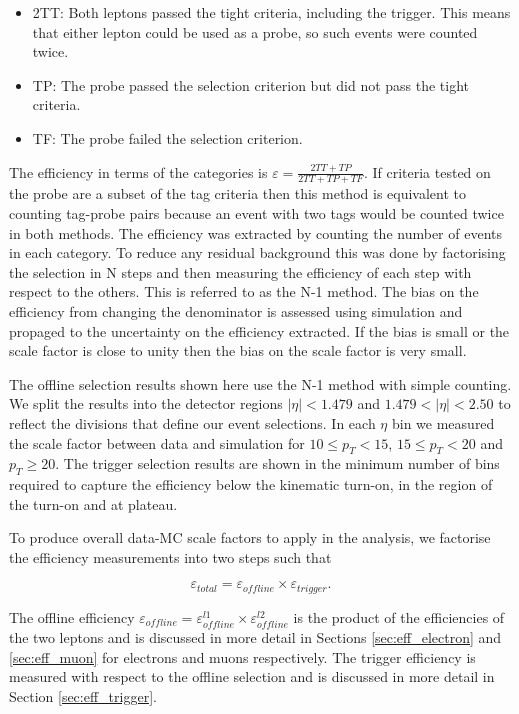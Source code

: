 \begin{itemize}
    \item 2TT: Both leptons passed the tight criteria, including the trigger. This means that either lepton could be used as a probe, 
    so such events were counted twice.
    \item TP: The probe passed the selection criterion but did not pass the tight criteria.
    \item TF: The probe failed the selection criterion.
\end{itemize}

The efficiency in terms of the categories is $\varepsilon = \frac{2TT + TP}{2TT + TP + TF}$.
If criteria tested on the probe are a subset of the tag criteria then
this method is equivalent to counting tag-probe pairs because an event with two tags
would be counted twice in both methods.
The efficiency was extracted by counting the number of events in each category.
To reduce any residual background this was done by factorising the selection in
N steps and then measuring the efficiency of each step with respect to 
the others.  This is referred to as the N-1 method.
The bias on the efficiency from changing the denominator is assessed using
simulation and propaged to the uncertainty on the efficiency extracted.
If the bias is small or the scale factor is close to unity then the bias on
the scale factor is very small.

The offline selection results shown here use the N-1 method with simple counting.
We split the results into the detector regions $|\eta|<1.479$ and $1.479<|\eta|<2.50$
to reflect the divisions that define our event selections.
In each $\eta$ bin we measured the scale factor between data and simulation
for $10\leq p_T<15$, $15\leq p_T<20$ and $p_T\geq 20$.
The trigger selection results are shown in the minimum number of bins required
to capture the efficiency below the kinematic turn-on, in the region of the turn-on
and at plateau.

To produce overall data-MC scale factors to apply in the analysis, we factorise the efficiency measurements
into two steps such that

\begin{equation}
\varepsilon_{total} = \varepsilon_{offline} \times \varepsilon_{trigger}.
\end{equation}

The offline efficiency $\varepsilon_{offline} = \varepsilon_{offline}^{l1} \times \varepsilon_{offline}^{l2}$
is the product of the efficiencies of the two leptons and is discussed in more detail in Sections \ref{sec:eff_electron}
and \ref{sec:eff_muon} for electrons and muons respectively.
The trigger efficiency is measured with respect to the offline selection and
is discussed in more detail in Section \ref{sec:eff_trigger}.

